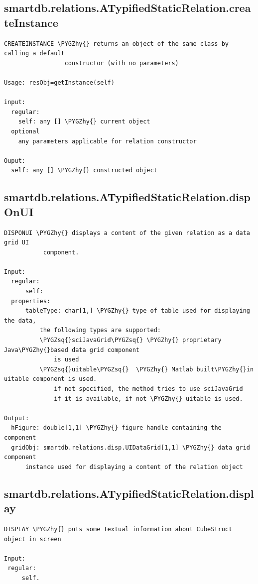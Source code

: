 \documentclass[letterpaper,10pt,english]{sphinxmanual}
\def\PYGZhy{\char`\-}
\def\PYGZsq{\char`\'}
\begin{document}
\subsection{smartdb.relations.ATypifiedStaticRelation.createInstance}
\label{chap_functions:smartdb-relations-atypifiedstaticrelation-createinstance}
\begin{Verbatim}[commandchars=\\\{\}]
CREATEINSTANCE \PYGZhy{} returns an object of the same class by calling a default
                 constructor (with no parameters)

Usage: resObj=getInstance(self)

input:
  regular:
    self: any [] \PYGZhy{} current object
  optional
    any parameters applicable for relation constructor

Ouput:
  self: any [] \PYGZhy{} constructed object
\end{Verbatim}


\subsection{smartdb.relations.ATypifiedStaticRelation.dispOnUI}
\label{chap_functions:smartdb-relations-atypifiedstaticrelation-disponui}
\begin{Verbatim}[commandchars=\\\{\}]
DISPONUI \PYGZhy{} displays a content of the given relation as a data grid UI
           component.

Input:
  regular:
      self:
  properties:
      tableType: char[1,] \PYGZhy{} type of table used for displaying the data,
          the following types are supported:
          \PYGZsq{}sciJavaGrid\PYGZsq{} \PYGZhy{} proprietary Java\PYGZhy{}based data grid component
              is used
          \PYGZsq{}uitable\PYGZsq{}  \PYGZhy{} Matlab built\PYGZhy{}in uitable component is used.
              if not specified, the method tries to use sciJavaGrid
              if it is available, if not \PYGZhy{} uitable is used.

Output:
  hFigure: double[1,1] \PYGZhy{} figure handle containing the component
  gridObj: smartdb.relations.disp.UIDataGrid[1,1] \PYGZhy{} data grid component
      instance used for displaying a content of the relation object
\end{Verbatim}


\subsection{smartdb.relations.ATypifiedStaticRelation.display}
\label{chap_functions:smartdb-relations-atypifiedstaticrelation-display}
\begin{Verbatim}[commandchars=\\\{\}]
DISPLAY \PYGZhy{} puts some textual information about CubeStruct object in screen

Input:
 regular:
     self.
\end{Verbatim}
\end{document}
